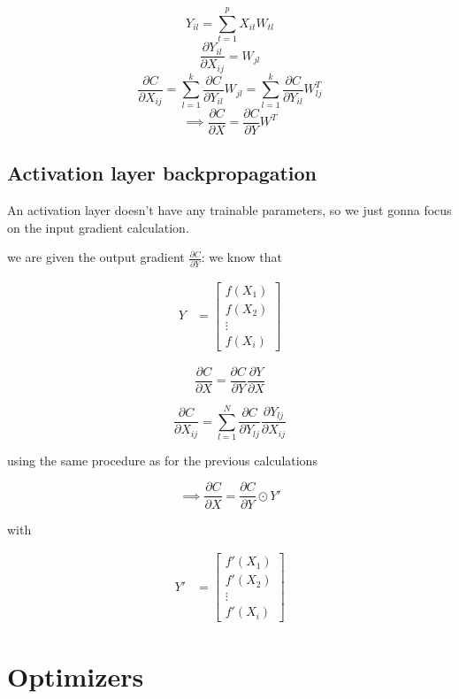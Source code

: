 \documentclass[a4paper, twocolumn, twoside]{article}
\begin{document}
	$$
		Y_{il} = \sum_{t=1}^{p} X_{it}W_{tl}
	$$
	$$
		\frac{\partial Y_{il}}{\partial X_{ij}} = W_{jl}
	$$
	$$
		\frac{\partial C}{\partial X_{ij}} = \sum_{l=1}^{k} \frac{\partial C}{\partial Y_{il}}W_{jl}
		= \sum_{l=1}^{k} \frac{\partial C}{\partial Y_{il}} W_{lj}^{T}
	$$
	$$
		\implies \frac{\partial C}{\partial X} = \frac{\partial C}{\partial Y} W^{T}
	$$

	\subsection{Activation layer backpropagation}

	An activation layer doesn't have any trainable parameters, so we just gonna focus on the input gradient calculation.

	we are given
	the output gradient $\frac{\partial C}{\partial Y}$:
	we know that 

	\begin{align*}
		Y &= \begin{bmatrix}
		f(X_1) \\
		f(X_2) \\
        \vdots \\
		f(X_i)
	\end{bmatrix}
	\end{align*}

	$$
    \frac{\partial C}{\partial X} = \frac{\partial C}{\partial Y} \frac{\partial Y}{\partial X}
	$$

	$$
    \frac{\partial C}{\partial X_{ij}} = \sum_{l=1}^{N} \frac{\partial C}{\partial Y_{lj}} \frac{\partial Y_{lj}}{\partial X_{ij}}
	$$

	using the same procedure as for the previous calculations

	$$
	\implies \frac{\partial C}{\partial X} = \frac{\partial C}{\partial Y} \odot Y\prime
	$$

	with 

	\begin{align*}
		Y\prime &= \begin{bmatrix}
		f\prime(X_1) \\
		f\prime(X_2) \\
        \vdots \\
		f\prime(X_i)
	\end{bmatrix}
	\end{align*}

	\section{Optimizers}
	
\end{document}
